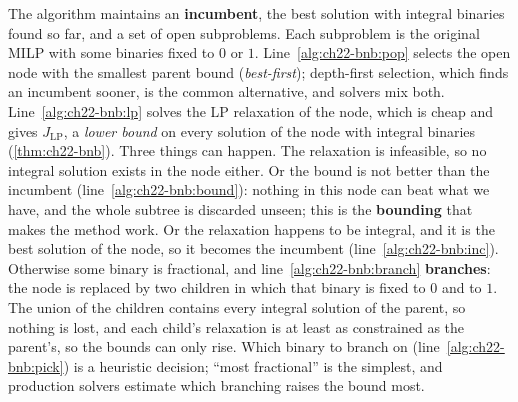 The algorithm maintains an \textbf{incumbent}, the best
solution with integral binaries found so far, and a set of open subproblems.
Each subproblem is the original MILP with some binaries fixed to $0$ or $1$.
Line~\ref{alg:ch22-bnb:pop} selects the open node with the smallest parent
bound (\emph{best-first}); depth-first selection, which finds an incumbent
sooner, is the common alternative, and solvers mix both.
Line~\ref{alg:ch22-bnb:lp} solves the LP relaxation of the node, which is
cheap and gives $J_{\mathrm{LP}}$, a \emph{lower bound} on every solution of
the node with integral binaries (\cref{thm:ch22-bnb}). Three things can
happen. The relaxation is infeasible, so no integral solution exists in the
node either. Or the bound is not better than the incumbent
(line~\ref{alg:ch22-bnb:bound}): nothing in this node can beat what we have,
and the whole subtree is discarded unseen; this is the
\textbf{bounding} that makes the method
work. Or the relaxation happens to be integral, and it is the best solution
of the node, so it becomes the incumbent (line~\ref{alg:ch22-bnb:inc}).
Otherwise some binary is fractional, and line~\ref{alg:ch22-bnb:branch}
\textbf{branches}: the node is replaced by
two children in which that binary is fixed to $0$ and to $1$. The union of
the children contains every integral solution of the parent, so nothing is
lost, and each child's relaxation is at least as constrained as the
parent's, so the bounds can only rise. Which binary to branch on
(line~\ref{alg:ch22-bnb:pick}) is a heuristic decision; ``most fractional''
is the simplest, and production solvers estimate which branching raises the
bound most.

